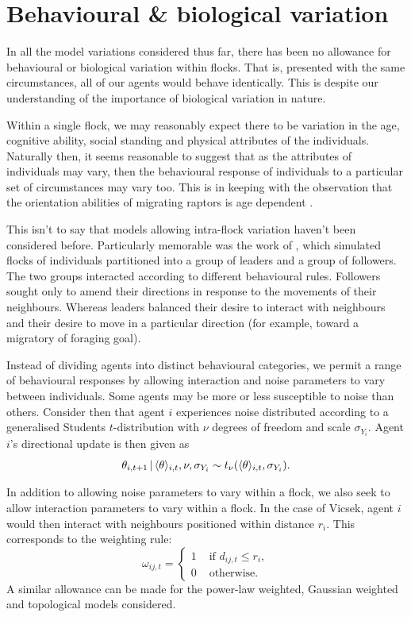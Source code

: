 \section{Behavioural \& biological variation}

In all the model variations considered thus far, there has been no allowance for
behavioural or biological variation within flocks. That is, presented with the same
circumstances, all of our agents would behave identically. This is despite our
understanding of the importance of biological variation in nature.

Within a single flock, we may reasonably expect there to be variation in the age,
cognitive ability, social standing and physical attributes of the individuals. Naturally
then, it seems reasonable to suggest that as the attributes of individuals may vary, then
the behavioural response of individuals to a particular set of circumstances may vary too.
This is in keeping with the observation that the orientation abilities of migrating
raptors is age dependent \parencite{thorup03}.

This isn't to say that models allowing intra-flock variation haven't been considered
before. Particularly memorable was the work of \textcite{couzin05}, which simulated flocks
of individuals partitioned into a group of leaders and a group of followers. The two groups
interacted according to different behavioural rules. Followers sought only to amend their
directions in response to the movements of their neighbours. Whereas leaders balanced
their desire to interact with neighbours and their desire to move in a particular
direction (for example, toward a migratory of foraging goal).

Instead of dividing agents into distinct behavioural categories, we permit a range of
behavioural responses by allowing interaction and noise parameters to vary between
individuals. Some agents may be more or less susceptible to noise than others. Consider
then that agent $i$ experiences noise distributed according to a generalised Students
$t$-distribution with $\nu$ degrees of freedom and scale $\sigma_{Y_i}$. Agent $i$'s
directional update is then given as
\begin{equation*}
    \theta_{i,t+1} \,|\, \langle\theta\rangle_{i,t}, \nu, \sigma_{Y_i} \sim
    t_{\nu}(\langle\theta\rangle_{i,t}, \sigma_{Y_i}).
\end{equation*}

In addition to allowing noise parameters to vary within a flock, we also seek to allow
interaction parameters to vary within a flock. In the case of Vicsek, agent $i$ would then
interact with neighbours positioned within distance $r_i$. This corresponds to the
weighting rule:
\begin{equation}
    \label{eq:vicsek_interaction}
    \omega_{ij,t} =
    \begin{cases}
        1 & \text{ if } d_{ij, t} \leq r_i,\\
        0 & \text{ otherwise.}
    \end{cases}
\end{equation}
A similar allowance can be made for the power-law weighted, Gaussian weighted and
topological models considered.

